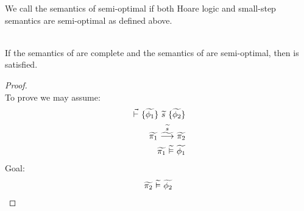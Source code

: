 We call the semantics of \gvl semi-optimal if both Hoare logic and small-step semantics are semi-optimal as defined above.

\begin{theorem}~\\
    \label{thm:compl-and-so-to-gdpres}
    If the semantics of \svl are complete and the semantics of \gvl are semi-optimal, then  is satisfied.
\end{theorem}
\begin{proof}~\\
    To prove  we may assume:
    \begin{align}
    \label{frm:tmp0}
    \dgthoare{}{\grad{\phi_1}}{\grad{s}}{\grad{\phi_2}}\\
    \label{frm:tmp1}
    \gsstepConsume{\grad{s}}{\grad{\pi_1}}{\grad{\pi_2}}\\
    \label{frm:tmp2}
    \evalgphiGen{\grad{\pi_1}}{\grad{\phi_1}}
    \end{align}
    Goal: 
    \begin{align}
    \label{frm:tmp3}
    \evalgphiGen{\grad{\pi_2}}{\grad{\phi_2}}
    \end{align}
    

\end{proof}
